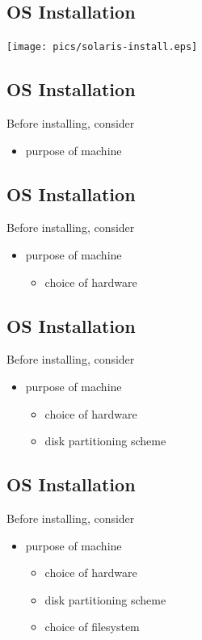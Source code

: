 \documentclass[xga]{xdvislides}
\begin{document}
\subsection{OS Installation}
\begin{center}
	\texttt{[image: pics/solaris-install.eps]}
\end{center}


\subsection{OS Installation}
Before installing, consider
\begin{itemize}
	\item purpose of machine
\end{itemize}

\subsection{OS Installation}
Before installing, consider
\begin{itemize}
	\item purpose of machine
		\begin{itemize}
			\item choice of hardware
		\end{itemize}
\end{itemize}

\subsection{OS Installation}
Before installing, consider
\begin{itemize}
	\item purpose of machine
		\begin{itemize}
			\item choice of hardware
			\item disk partitioning scheme
		\end{itemize}
\end{itemize}

\subsection{OS Installation}
Before installing, consider
\begin{itemize}
	\item purpose of machine
		\begin{itemize}
			\item choice of hardware
			\item disk partitioning scheme
			\item choice of filesystem
		\end{itemize}
\end{itemize}
\end{document}
